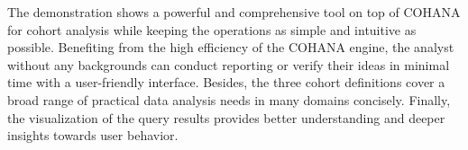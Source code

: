 The demonstration shows a powerful and comprehensive tool on top of COHANA for cohort analysis while keeping the operations as simple and intuitive as possible. Benefiting from the high efficiency of the COHANA engine, the analyst without any backgrounds can conduct reporting or verify their ideas in minimal time with a user-friendly interface. Besides, the three cohort definitions cover a broad range of practical data analysis needs in many domains concisely. Finally, the visualization of the query results provides better understanding and deeper insights towards user behavior.